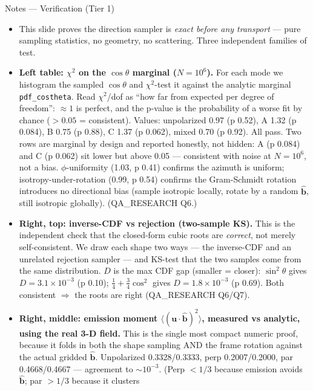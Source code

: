 \documentclass[11pt,aspectratio=169]{beamer}
\newcommand{\bhat}{\hat{\mathbf{b}}}
\begin{document}
\begin{frame}[allowframebreaks]{Notes --- Verification (Tier 1)}
{\color{red}\footnotesize
\begin{itemize}
\item This slide proves the direction sampler is \emph{exact before any transport} --- pure sampling
      statistics, no geometry, no scattering. Three independent families of test.
\item \textbf{Left table: $\chi^2$ on the $\cos\theta$ marginal ($N=10^6$).} For each mode we
      histogram the sampled $\cos\theta$ and $\chi^2$-test it against the analytic marginal
      \texttt{pdf\_costheta}. Read $\chi^2$/dof as ``how far from expected per degree of freedom'':
      $\approx 1$ is perfect, and the p-value is the probability of a worse fit by chance ($>0.05$ =
      consistent). Values: unpolarized 0.97 (p 0.52), A 1.32 (p 0.084), B 0.75 (p 0.88), C 1.37
      (p 0.062), mixed 0.70 (p 0.92). All pass. Two rows are marginal by design and reported
      honestly, not hidden: A (p 0.084) and C (p 0.062) sit lower but above 0.05 --- consistent with
      noise at $N=10^6$, not a bias. $\phi$-uniformity (1.03, p 0.41) confirms the azimuth is uniform;
      isotropy-under-rotation (0.99, p 0.54) confirms the Gram-Schmidt rotation introduces no
      directional bias (sample isotropic locally, rotate by a random $\bhat$, still isotropic
      globally). (QA\_RESEARCH Q6.)
\item \textbf{Right, top: inverse-CDF vs rejection (two-sample KS).} This is the independent check
      that the closed-form cubic roots are \emph{correct}, not merely self-consistent. We draw each
      shape two ways --- the inverse-CDF and an unrelated rejection sampler --- and KS-test that the
      two samples come from the same distribution. $D$ is the max CDF gap (smaller = closer):
      $\sin^2\theta$ gives $D=3.1\times10^{-3}$ (p 0.10); $\tfrac14+\tfrac34\cos^2$ gives
      $D=1.8\times10^{-3}$ (p 0.69). Both consistent $\Rightarrow$ the roots are right
      (QA\_RESEARCH Q6/Q7).
\item \textbf{Right, middle: emission moment $\langle(\mathbf{u}\cdot\bhat)^2\rangle$, measured vs
      analytic, using the real 3-D field.} This is the single most compact numeric proof, because it
      folds in both the shape sampling AND the frame rotation against the actual gridded $\bhat$.
      Unpolarized 0.3328/0.3333, perp 0.2007/0.2000, par 0.4668/0.4667 --- agreement to
      $\sim10^{-3}$. (Perp $<1/3$ because emission avoids $\bhat$; par $>1/3$ because it clusters

\end{itemize}}
\end{frame}
\end{document}
